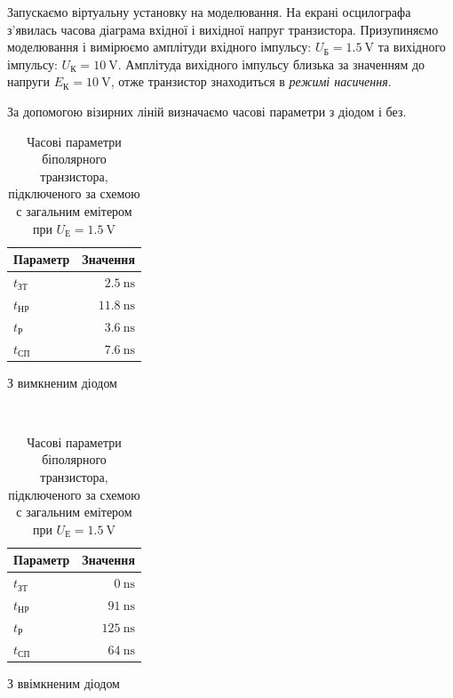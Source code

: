 \documentclass[a4paper,oneside,DIV=10,12pt]{scrartcl}
\begin{document}
		Запускаємо віртуальну установку на моделювання. На екрані осцилографа з'я\-ви\-лась часова діаграма вхідної і вихідної напруг транзистора. Призупиняємо моделювання і вимірюємо амплітуди вхідного імпульсу: $U_{\text{Б}} = \SI{1,5}{\volt}$ та вихідного імпульсу: $U_{\text{К}} = \SI{10}{\volt}$. Амплітуда вихідного імпульсу близька за значенням до напруги $E_{\text{К}} = \SI{10}{\volt}$, отже транзистор знаходиться в \emph{режимі насичення}.
		
		За допомогою візирних ліній визначаємо часові параметри з діодом і без.
		
		
		\begin{table}[H]
		\centering
			\begin{subtable}[h]{0.4\textwidth}
			\centering
				\begin{tabular}{lr}
				\toprule
				Параметр & Значення\\
				\midrule
				$t_{\text{ЗТ}}$ & $\SI{2,5}{\nano\second}$\\
				$t_{\text{НР}}$ & $\SI{11,8}{\nano\second}$\\
				$t_{\text{Р}}$ & $\SI{3,6}{\nano\second}$\\
				$t_{\text{СП}}$ & $\SI{7,6}{\nano\second}$\\
				\bottomrule
				\end{tabular}
				\caption{З вимкненим діодом}
			\end{subtable}
			~
			\begin{subtable}[h]{0.4\textwidth}
			\centering
				\begin{tabular}{lr}
				\toprule
				Параметр & Значення\\
				\midrule
				$t_{\text{ЗТ}}$ & $\SI{0}{\nano\second}$\\
				$t_{\text{НР}}$ & $\SI{91}{\nano\second}$\\
				$t_{\text{Р}}$ & $\SI{125}{\nano\second}$\\
				$t_{\text{СП}}$ & $\SI{64}{\nano\second}$\\
				\bottomrule
				\end{tabular}
				\caption{З ввімкненим діодом}
			\end{subtable}
			
		\caption{Часові параметри біполярного транзистора, підключеного за схемою с загальним емітером при $U_{\text{Е}} = \SI{1,5}{\volt}$}
		\end{table}
		
\end{document}

